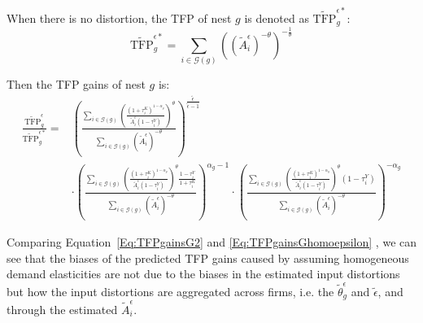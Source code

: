 \documentclass[12pt]{article}
\begin{document}
When there is no distortion, the TFP of nest $g$ is denoted as $\widetilde{\text{TFP}}_g^{\epsilon*}$:
$$\widetilde{\text{TFP}}_g^{\epsilon*}= \sum_{i \in \mathcal{G}(g)}\left( (\tilde{A}_i^{\epsilon})^{-\theta} \right)^{-\frac{1}{\theta}}$$

Then the TFP gains of nest $g$ is:
\begin{align}
\frac{\widetilde{\text{TFP}}_g^{\epsilon}}{\widetilde{\text{TFP}}_g^{\epsilon*}}=& \left( \frac{\sum_{i\in\mathcal{G}(g)}\left( \frac{(1+\tau_i^K)^{1-\alpha_g}}{\tilde{A}^{\epsilon}_i(1-\tau_i^Y)} \right)^{\theta}}{\sum_{i \in \mathcal{G}(g)} (\tilde{A}^{\epsilon}_i)^{-\theta}} \right)^{\frac{\tilde{\epsilon}}{\tilde{\epsilon}-1}} \label{Eq:TFPgainsGhomoepsilon}\\
& \cdot \left( \frac{\sum_{i\in\mathcal{G}(g)}\left( \frac{(1+\tau_i^K)^{1-\alpha_g}}{\tilde{A}^{\epsilon}_i(1-\tau_i^Y)} \right)^{\theta} \frac{1-\tau_i^Y}{1+\tau_i^K}}{\sum_{i \in \mathcal{G}(g)} (\tilde{A}^{\epsilon}_i)^{-\theta}} \right)^{\alpha_g-1} \cdot \left( \frac{\sum_{i\in\mathcal{G}(g)}\left( \frac{(1+\tau_i^K)^{1-\alpha_g}}{\tilde{A}^{\epsilon}_i(1-\tau_i^Y)} \right)^{\theta} (1-\tau_i^Y)}{\sum_{i \in \mathcal{G}(g)} (\tilde{A}^{\epsilon}_i)^{-\theta}}\right)^{-\alpha_g} \nonumber
\end{align}


Comparing  Equation~\eqref{Eq:TFPgainsG2} and \eqref{Eq:TFPgainsGhomoepsilon} , we can see that the biases of the predicted TFP gains caused by assuming homogeneous demand elasticities are not due to the biases in the estimated input distortions but how the input distortions are aggregated across firms, i.e. the $\tilde{\theta}^{\epsilon}_g$ and $\tilde{\epsilon}$, and through the estimated $\tilde{A}^{\epsilon}_i$.
\end{document}
